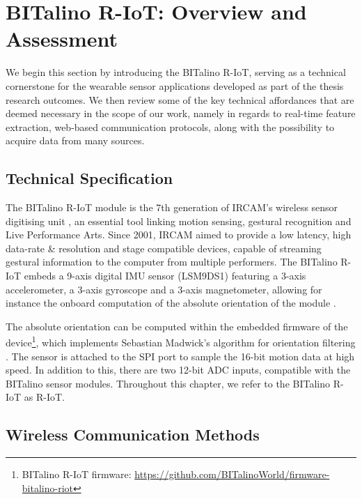 \section{BITalino R-IoT: Overview and Assessment}

We begin this section by introducing the BITalino R-IoT, serving as a technical cornerstone for the wearable sensor applications developed as part of the thesis research outcomes. We then review some of the key technical affordances that are deemed necessary in the scope of our work, namely in regards to real-time feature extraction, web-based communication protocols, along with the possibility to acquire data from many sources.

\subsection*{Technical Specification}
\label{subsec:riot}


The BITalino R-IoT module is the 7th generation of IRCAM's wireless sensor digitising unit \cite{noauthor_bitalino_nodate}, an essential tool linking motion sensing, gestural recognition and Live Performance Arts. Since 2001, IRCAM aimed to provide a low latency, high data-rate \& resolution and stage compatible devices, capable of streaming gestural information to the computer from multiple performers. The BITalino R-IoT embeds a 9-axis digital IMU sensor (LSM9DS1) featuring a 3-axis accelerometer, a 3-axis gyroscope and a 3-axis magnetometer, allowing for instance the onboard computation of the absolute orientation of the module \cite{matzka_developing_2019}.

The absolute orientation can be computed within the embedded firmware of the device\footnote{BITalino R-IoT firmware: \url{https://github.com/BITalinoWorld/firmware-bitalino-riot}}, which implements Sebastian Madwick’s algorithm for orientation filtering \cite{madgwick_ecient_nodate}. The sensor is attached to the SPI port to sample the 16-bit motion data at high speed. In addition to this, there are two 12-bit ADC inputs, compatible with the BITalino sensor modules. Throughout this chapter, we refer to the BITalino R-IoT as R-IoT.

\subsection*{Wireless Communication Methods}

